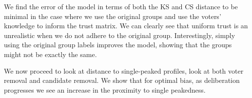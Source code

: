 We find the error of the model in terms of both the KS and CS distance to be minimal in the case where we use the original groups and use the voters' knowledge to inform the trust matrix. We can clearly see that uniform trust is an unrealistic when we do not adhere to the original group. Interestingly, simply using the original group labels improves the model, showing that the groups might not be exactly the same.

We now proceed to look at distance to single-peaked profiles, look at both
voter removal and candidate removal. We show that for optimal bias, as
deliberation progresses we see an increase in the proximity to single
peakedness.

